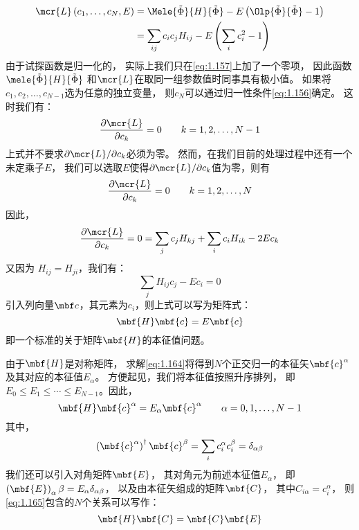 \begin{equation}
 \begin{split}
     \mcr{L}\left(c_1, \dots, c_N, E\right) &= \Mele{\tilde\Phi}{H}{\tilde\Phi} - E\left(\Olp{\tilde\Phi}{\tilde\Phi} - 1\right) \\
     &= \sum_{ij} c_ic_jH_{ij} - E\left(\sum_i c_i^2 -1\right)
 \end{split}
 \label{eq:1.159}
\end{equation}
由于试探函数是归一化的，
实际上我们只在\autoref{eq:1.157}上加了一个零项，
因此函数$\mele{\tilde\Phi}{H}{\tilde\Phi}$ 和$\mcr{L}$在取同一组参数值时同事具有极小值。
如果将$c_1, c_2, \dots, c_{N-1}$选为任意的独立变量，
则$c_N$可以通过归一性条件\autoref{eq:1.156}确定。
这时我们有：
\begin{equation}
 \frac{\partial \mcr{L}}{\partial c_k} = 0 \qquad k = 1, 2, \dots, N-1
 \label{eq:1.160}
\end{equation}
上式并不要求$\partial\mcr{L}/\partial{c_k}$必须为零。
然而，在我们目前的处理过程中还有一个未定乘子$E$，
我们可以选取$E$使得$\partial\mcr{L}/\partial{c_k}$值为零，则有
\begin{equation}
 \frac{\partial \mcr{L}}{\partial c_k} = 0 \qquad k = 1, 2, \dots, N
 \label{eq:1.161}
\end{equation}
因此，
\begin{equation}
 \frac{\partial \mcr{L}}{\partial c_k} = 0 = \sum_j c_j H_{kj} + \sum_i c_i H_{ik} - 2 E c_k
 \label{eq:1.162}
\end{equation}
又因为 $H_{ij} = H_{ji}$，我们有：
\begin{equation}
 \sum_j H_{ij}c_j - Ec_i = 0
 \label{eq:1.163}
\end{equation}
引入列向量$\mbf c$，其元素为$c_i$，则上式可以写为矩阵式：
\begin{equation}
 \mbf{H}\mbf{c} = E \mbf{c}
 \label{eq:1.164}
\end{equation}
即一个标准的关于矩阵$\mbf{H}$的本征值问题。

由于$\mbf{H}$是对称矩阵，
求解\autoref{eq:1.164}将得到$N$个正交归一的本征矢$\mbf{c}^\alpha$及其对应的本征值$E_\alpha$。
方便起见，我们将本征值按照升序排列，
即$E_0 \leq E_1 \leq \cdots \leq E_{N-1}$。因此，
\begin{equation}
 \mbf{H}\mbf{c}^\alpha = E_\alpha \mbf{c}^\alpha\qquad \alpha = 0, 1, \dots, N-1
 \label{eq:1.165}
\end{equation}
其中，
\begin{equation}
 \left(\mbf{c}^\alpha\right)^\dagger\mbf{c}^\beta = \sum_i c_i^\alpha c_i^\beta = \delta_{\alpha\beta}
 \label{eq:1.166}
\end{equation}
我们还可以引入对角矩阵$\mbf{E}$，
其对角元为前述本征值$E_\alpha$，
即$\left(\mbf{E}\right)_\alpha\beta = E_\alpha\delta_{\alpha\beta}$，
以及由本征矢组成的矩阵$\mbf{C}$，
其中$C_{i\alpha} = c_i^\alpha$，
则\autoref{eq:1.165}包含的$N$个关系可以写作：
\begin{equation}
 \mbf{H}\mbf{C} = \mbf{C}\mbf{E}
 \label{eq:1.167}
\end{equation}

